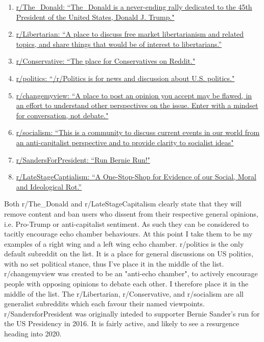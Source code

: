 \documentclass{article}
\begin{document}
\begin{enumerate}
    \item \href{https://www.reddit.com/r/The_Donald}{r/The\_Donald: ``The\_Donald is a never-ending rally dedicated to the 45th President of the United States, Donald J. Trump."}
    
    \item \href{https://www.reddit.com/r/Conservative}{r/Libertarian: ``A place to discuss free market libertarianism and related topics, and share things that would be of interest to libertarians.''}
    
    \item \href{https://www.reddit.com/r/Conservative}{r/Conservative: ``The place for Conservatives on Reddit." }
    
    \item \href{https://www.reddit.com/r/politics}{r/politics: ``/r/Politics is for news and discussion about U.S. politics."}
    
    \item \href{https://www.reddit.com/r/Conservative}{r/changemyview: ``A place to post an opinion you accept may be flawed, in an effort to understand other perspectives on the issue. Enter with a mindset for conversation, not debate."}
    
    \item \href{https://www.reddit.com/r/socialism}{r/socialism: ``This is a community to discuss current events in our world from an anti-capitalist perspective and to provide clarity to socialist ideas"}
    \item \href{https://www.reddit.com/r/SandersForPresident}{r/SandersForPresident: ``Run Bernie Run!"}
    \item \href{https://www.reddit.com/r/Conservative}{r/LateStageCaptialism: ``A One-Stop-Shop for Evidence of our Social, Moral and Ideological Rot.''}
\end{enumerate}

Both r/The\_Donald and r/LateStageCapitalism clearly state that they will remove content and ban users who dissent from their respective general opinions, i.e. Pro-Trump or anti-capitalist sentiment. As such they can be considered to tacitly encourage echo chamber behaviours. At this point I take them to be my examples of a right wing and a left wing echo chamber. r/politics is the only default subreddit on the list. It is a place for general discussions on US politics, with no set political stance, thus I've place it in the middle of the list. r/changemyview was created to be an "anti-echo chamber", to actively encourage people with opposing opinions to debate each other. I therefore place it in the middle of the list. The r/Libertarian, r/Conservative, and r/socialism are all generalist subreddits which each favour their named viewpoints. r/SandersforPresident was originally inteded to supporter Bernie Sander's run for the US Presidency in 2016. It is fairly active, and likely to see a resurgence heading into 2020.
\end{document}
